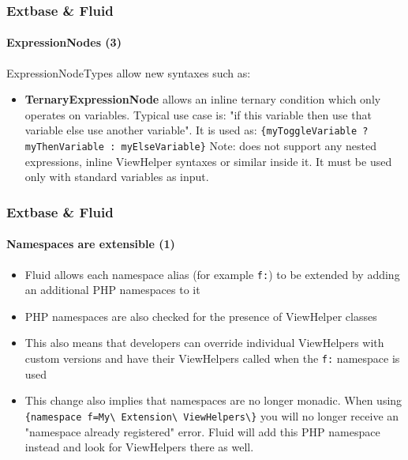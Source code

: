 \begin{frame}[fragile]
	\frametitle{Extbase \& Fluid}
	\framesubtitle{ExpressionNodes (3)}

	ExpressionNodeTypes allow new syntaxes such as:

	\begin{itemize}

		\item \textbf{TernaryExpressionNode}\newline
			\small
				allows an inline ternary condition which only operates on variables.
				Typical use case is: "if this variable then use that variable else use
				another variable". It is used as:\newline
				\texttt{\{myToggleVariable ? myThenVariable : myElseVariable\}}\newline
				Note: does not support any nested expressions, inline ViewHelper
				syntaxes or similar inside it. It must be used only with standard
				variables as input.
			\normalsize

	\end{itemize}

\end{frame}


\begin{frame}[fragile]
	\frametitle{Extbase \& Fluid}
	\framesubtitle{Namespaces are extensible (1)}

	\begin{itemize}

		\item Fluid allows each namespace alias (for example \texttt{f:}) to be
			extended by adding an additional PHP namespaces to it

		\item PHP namespaces are also checked for the presence of ViewHelper classes

		\item This also means that developers can override individual ViewHelpers
			with custom versions and have their ViewHelpers called when the
			\texttt{f:} namespace is used

		\item This change also implies that namespaces are no longer monadic.\newline
			When using
			\texttt{
				\{namespace f=My\textbackslash
				Extension\textbackslash
				ViewHelpers\textbackslash\}}\newline
				you will no longer receive an "namespace already registered" error.
				Fluid will add this PHP namespace instead and look for ViewHelpers
				there as well.

	\end{itemize}

\end{frame}

